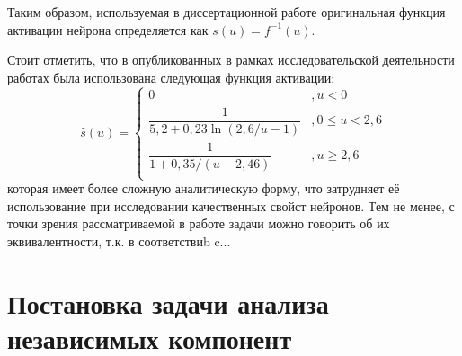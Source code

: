 
Таким образом, используемая в диссертационной работе оригинальная функция активации нейрона определяется как $s(u) = f^{-1}(u)$.

Стоит отметить, что в опубликованных в рамках исследовательской деятельности работах \cite{Prostov2015-OMNN,Prostov2015-MEPhI,Prostov2015-ESU} была использована следующая функция активации:
$$
    \hat{s}(u) = 
    \begin{cases}
        0                                       &, u < 0            \\  
        \dfrac{1}{5,2 + 0,23 \ln(2,6/u - 1)}    &, 0 \le u < 2,6    \\
        \dfrac{1}{1 + 0,35 / (u - 2,46)}        &, u \ge 2,6        \\
    \end{cases}
$$
которая имеет более сложную аналитическую форму, что затрудняет её использование при исследовании качественных свойст нейронов. Тем не менее, с точки зрения рассматриваемой в работе задачи можно говорить об их эквивалентности, т.к. в соответствиb c...



\section{Постановка задачи анализа независимых компонент}  \label{appendix:math:ica_description}

